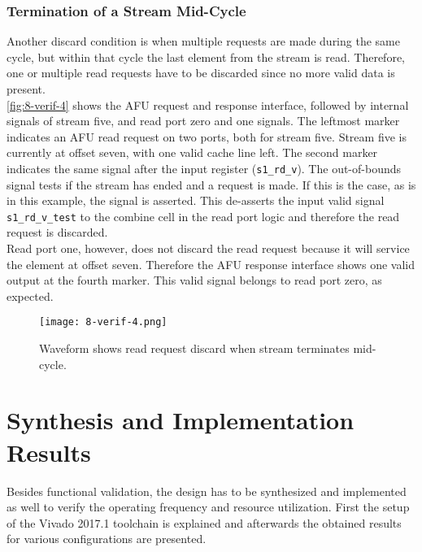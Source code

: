 \subsubsection{Termination of a Stream Mid-Cycle}
Another discard condition is when multiple requests are made during the same cycle, but within that cycle the last element from the stream is read. Therefore, one or multiple read requests have to be discarded since no more valid data is present.\\
\autoref{fig:8-verif-4} shows the AFU request and response interface, followed by internal signals of stream five, and read port zero and one signals. The leftmost marker indicates an AFU read request on two ports, both for stream five. Stream five is currently at offset seven, with one valid cache line left. The second marker indicates the same signal after the input register (\texttt{s1\_rd\_v}). The out-of-bounds signal tests if the stream has ended and a request is made. If this is the case, as is in this example, the signal is asserted. This de-asserts the input valid signal \texttt{s1\_rd\_v\_test} to the combine cell in the read port logic and therefore the read request is discarded.\\
Read port one, however, does not discard the read request because it will service the element at offset seven. Therefore the AFU response interface shows one valid output at the fourth marker. This valid signal belongs to read port zero, as expected.

\begin{figure}[H]
  \centering
  \texttt{[image: 8-verif-4.png]}
  \caption{Waveform shows read request discard when stream terminates mid-cycle.}
  \label{fig:8-verif-4}
\end{figure}





\section{Synthesis and Implementation Results}
Besides functional validation, the design has to be synthesized and implemented as well to verify the operating frequency and resource utilization. First the setup of the Vivado 2017.1 toolchain is explained and afterwards the obtained results for various configurations are presented.



